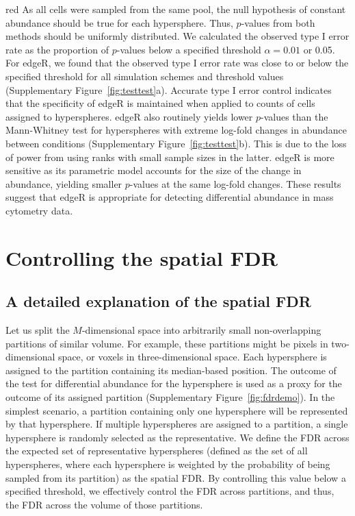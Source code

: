 \documentclass{article}
\begin{document}
\begin{color}{red}
As all cells were sampled from the same pool, the null hypothesis of constant abundance should be true for each hypersphere.
Thus, $p$-values from both methods should be uniformly distributed.
We calculated the observed type I error rate as the proportion of $p$-values below a specified threshold $\alpha=0.01$ or 0.05.
For edgeR, we found that the observed type I error rate was close to or below the specified threshold for all simulation schemes and threshold values (Supplementary Figure~\ref{fig:testtest}a).
Accurate type I error control indicates that the specificity of edgeR is maintained when applied to counts of cells assigned to hyperspheres.
edgeR also routinely yields lower $p$-values than the Mann-Whitney test for hyperspheres with extreme log-fold changes in abundance between conditions (Supplementary Figure~\ref{fig:testtest}b).
This is due to the loss of power from using ranks with small sample sizes in the latter.
edgeR is more sensitive as its parametric model accounts for the size of the change in abundance, yielding smaller $p$-values at the same log-fold changes.
These results suggest that edgeR is appropriate for detecting differential abundance in mass cytometry data.
\end{color}

\section{Controlling the spatial FDR}

\subsection{A detailed explanation of the spatial FDR}
\label{sec:fdr}
Let us split the $M$-dimensional space into arbitrarily small non-overlapping partitions of similar volume.
For example, these partitions might be pixels in two-dimensional space, or voxels in three-dimensional space.
Each hypersphere is assigned to the partition containing its median-based position.
The outcome of the test for differential abundance for the hypersphere is used as a proxy for the outcome of its assigned partition (Supplementary Figure~\ref{fig:fdrdemo}).
In the simplest scenario, a partition containing only one hypersphere will be represented by that hypersphere.
If multiple hyperspheres are assigned to a partition, a single hypersphere is randomly selected as the representative.
We define the FDR across the expected set of representative hyperspheres (defined as the set of all hyperspheres, where each hypersphere is weighted by the probability of being sampled from its partition) as the spatial FDR.
By controlling this value below a specified threshold, we effectively control the FDR across partitions, and thus, the FDR across the volume of those partitions.
\end{document}
